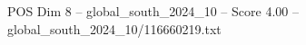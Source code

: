 \begin{textsample}{POS Dim 8 – global\_south\_2024\_10 – Score 4.00 – global\_south\_2024\_10/116660219.txt}
\end{textsample}
